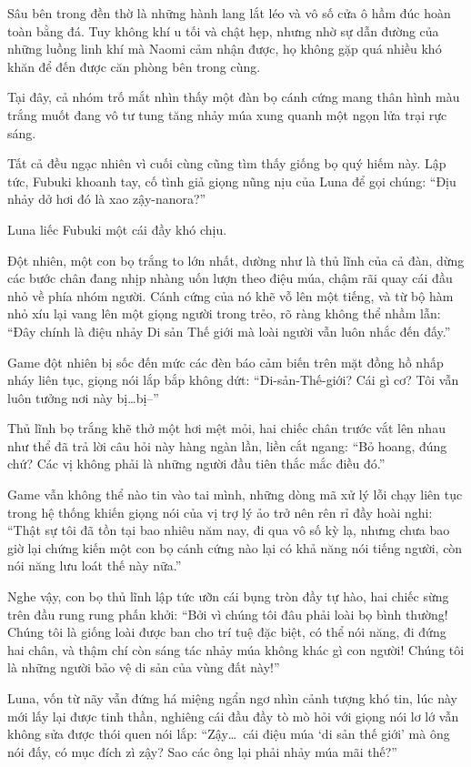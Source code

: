 \documentclass[../main.tex]{subfiles}
\begin{document}
Sâu bên trong đền thờ là những hành lang lắt léo và vô số cửa ô hầm đúc hoàn toàn bằng đá. Tuy không khí u tối và chật hẹp, nhưng nhờ sự dẫn đường của những luồng linh khí mà Naomi cảm nhận được, họ không gặp quá nhiều khó khăn để đến được căn phòng bên trong cùng.

Tại đây, cả nhóm trố mắt nhìn thấy một đàn bọ cánh cứng mang thân hình màu trắng muốt đang vô tư tung tăng nhảy múa xung quanh một ngọn lửa trại rực sáng.


Tất cả đều ngạc nhiên vì cuối cùng cũng tìm thấy giống bọ quý hiếm này. Lập tức, Fubuki khoanh tay, cố tình giả giọng nũng nịu của Luna để gọi chúng: ``Địu nhảy dở hơi đó là xao zậy-nanora?''

Luna liếc Fubuki một cái đầy khó chịu.

Đột nhiên, một con bọ trắng to lớn nhất, dường như là thủ lĩnh của cả đàn, dừng các bước chân đang nhịp nhàng uốn lượn theo điệu múa, chậm rãi quay cái đầu nhỏ về phía nhóm người. Cánh cứng của nó khẽ vỗ lên một tiếng, và từ bộ hàm nhỏ xíu lại vang lên một giọng người trong trẻo, rõ ràng không thể nhầm lẫn: ``Đây chính là điệu nhảy Di sản Thế giới mà loài người vẫn luôn nhắc đến đấy.''

Game đột nhiên bị sốc đến mức các đèn báo cảm biến trên mặt đồng hồ nhấp nháy liên tục, giọng nói lắp bắp không dứt: ``Di-sản-Thế-giới? Cái gì cơ? Tôi vẫn luôn tưởng nơi này bị\dots bị--''

Thủ lĩnh bọ trắng khẽ thở một hơi mệt mỏi, hai chiếc chân trước vắt lên nhau như thể đã trả lời câu hỏi này hàng ngàn lần, liền cắt ngang: ``Bỏ hoang, đúng chứ? Các vị không phải là những người đầu tiên thắc mắc điều đó.''

Game vẫn không thể nào tin vào tai mình, những dòng mã xử lý lỗi chạy liên tục trong hệ thống khiến giọng nói của vị trợ lý ảo trở nên rên rỉ đầy hoài nghi: ``Thật sự tôi đã tồn tại bao nhiêu năm nay, đi qua vô số kỳ lạ, nhưng chưa bao giờ lại chứng kiến một con bọ cánh cứng nào lại có khả năng nói tiếng người, còn nói năng lưu loát thế này nữa.''

Nghe vậy, con bọ thủ lĩnh lập tức ưỡn cái bụng tròn đầy tự hào, hai chiếc sừng trên đầu rung rung phấn khởi: ``Bởi vì chúng tôi đâu phải loài bọ bình thường! Chúng tôi là giống loài được ban cho trí tuệ đặc biệt, có thể nói năng, đi đứng hai chân, và thậm chí còn sáng tác nhảy múa không khác gì con người! Chúng tôi là những người bảo vệ di sản của vùng đất này!''

Luna, vốn từ nãy vẫn đứng há miệng ngẩn ngơ nhìn cảnh tượng khó tin, lúc này mới lấy lại được tinh thần, nghiêng cái đầu đầy tò mò hỏi với giọng nói lơ lớ vẫn không sửa được thói quen nói lắp: ``Zậy\dots\ cái điệu múa `di sản thế giới' mà ông nói đấy, có mục đích zì zậy? Sao các ông lại phải nhảy múa mãi thế?''
\end{document}

